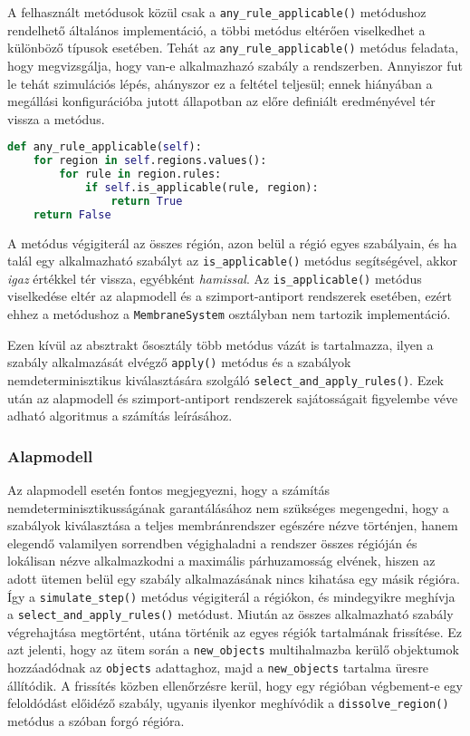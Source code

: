 A felhasznált metódusok közül csak a \verb|any_rule_applicable()| metódushoz rendelhető általános implementáció, a többi metódus eltérően viselkedhet a különböző típusok esetében. Tehát az \verb|any_rule_applicable()| metódus feladata, hogy megvizsgálja, hogy van-e alkalmazhazó szabály a rendszerben. Annyiszor fut le tehát szimulációs lépés, ahányszor ez a feltétel teljesül; ennek hiányában a megállási konfigurációba jutott állapotban az előre definiált eredményével tér vissza a metódus.

\begin{lstlisting}[language={Python}]
def any_rule_applicable(self):
	for region in self.regions.values():
		for rule in region.rules:
			if self.is_applicable(rule, region):
				return True
	return False
\end{lstlisting}

A metódus végigiterál az összes régión, azon belül a régió egyes szabályain, és ha talál egy alkalmazható szabályt az \verb|is_applicable()| metódus segítségével, akkor \textit{igaz} értékkel tér vissza, egyébként \textit{hamissal}.
Az \verb|is_applicable()| metódus viselkedése eltér az alapmodell és a szimport-antiport rendszerek esetében, ezért ehhez a metódushoz a \verb|MembraneSystem| osztályban nem tartozik implementáció.

Ezen kívül az absztrakt ősosztály több metódus vázát is tartalmazza, ilyen a szabály alkalmazását elvégző \verb|apply()| metódus és a szabályok nemdeterminisztikus kiválasztására szolgáló \verb|select_and_apply_rules()|.
Ezek után az alapmodell és szimport-antiport rendszerek sajátosságait figyelembe véve adható algoritmus a számítás leírásához.

\subsubsection{Alapmodell}

Az alapmodell esetén fontos megjegyezni, hogy a számítás nemdeterminisztikusságának garantálásához nem szükséges megengedni, hogy a szabályok kiválasztása a teljes membránrendszer egészére nézve történjen, hanem elegendő valamilyen sorrendben végighaladni a rendszer összes régióján és lokálisan nézve alkalmazkodni a maximális párhuzamosság elvének, hiszen az adott ütemen belül egy szabály alkalmazásának nincs kihatása egy másik régióra. Így a \verb|simulate_step()| metódus végigiterál a régiókon, és mindegyikre meghívja a \verb|select_and_apply_rules()| metódust. Miután az összes alkalmazható szabály végrehajtása megtörtént, utána történik az egyes régiók tartalmának frissítése. Ez azt jelenti, hogy az ütem során a \verb|new_objects| multihalmazba kerülő objektumok hozzáadódnak az \verb|objects| adattaghoz, majd a \verb|new_objects| tartalma üresre állítódik. A frissítés közben ellenőrzésre kerül, hogy egy régióban végbement-e egy feloldódást előidéző szabály, ugyanis ilyenkor meghívódik a \verb|dissolve_region()| metódus a szóban forgó régióra. 

